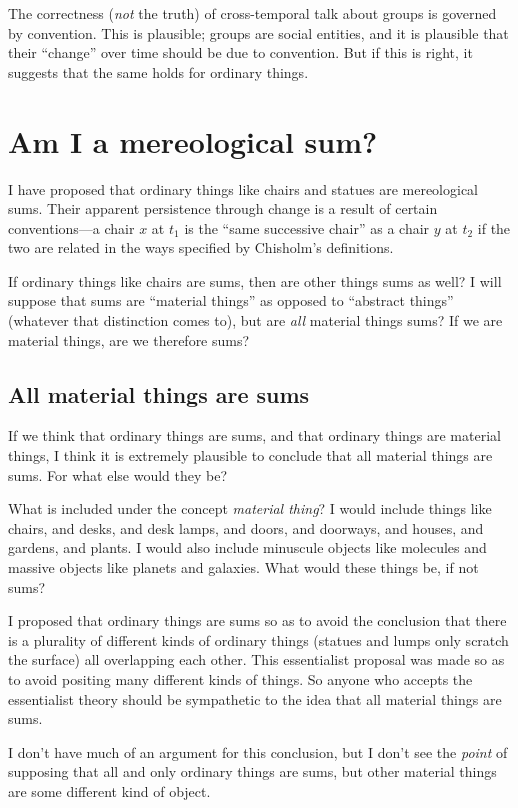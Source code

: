 \documentclass[12pt,twoside]{reedfancy}
\begin{document}
\begin{spacing}{1.25}
The correctness ({\em not} the truth) of cross-temporal talk about
groups is governed by convention.  This is plausible; groups are
social entities, and it is plausible that their ``change'' over time
should be due to convention.  But if this is right, it suggests that
the same holds for ordinary things.

\section{Am I a mereological sum?}
\label{i-sum}
I have proposed that ordinary things like chairs and statues are
mereological sums.  Their apparent persistence through change is a
result of certain conventions---a chair $x$ at $t_1$ is the ``same
successive chair'' as a chair $y$ at $t_2$ if the two are related in
the ways specified by Chisholm's definitions.

If ordinary things like chairs are sums, then are other things sums as
well?  I will suppose that sums are ``material things'' as opposed to
``abstract things'' (whatever that distinction comes to), but are {\em
  all} material things sums?  If we are material things, are we
therefore sums?

\subsection{All material things are sums}
\label{material-sum}
If we think that ordinary things are sums, and that ordinary things
are material things, I think it is extremely plausible to conclude
that all material things are sums.  For what else would they be?

What is included under the concept {\em material thing}?  I would
include things like chairs, and desks, and desk lamps, and doors, and
doorways, and houses, and gardens, and plants.  I would also include
minuscule objects like molecules and massive objects like planets and
galaxies.  What would these things be, if not sums?

I proposed that ordinary things are sums so as to avoid the conclusion
that there is a plurality of different kinds of ordinary things
(statues and lumps only scratch the surface) all overlapping each
other.  This essentialist proposal was made so as to avoid positing
many different kinds of things.  So anyone who accepts the
essentialist theory should be sympathetic to the idea that all
material things are sums.

I don't have much of an argument for this conclusion, but I don't see
the {\em point} of supposing that all and only ordinary things are
sums, but other material things are some different kind of object.


\end{spacing}
\end{document}
